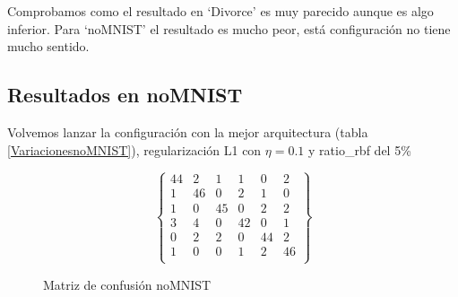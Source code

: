 Comprobamos como el resultado en `Divorce' es muy parecido aunque es algo inferior. Para `noMNIST' el resultado es mucho peor, está configuración no tiene mucho sentido.

\subsection{Resultados en noMNIST}

Volvemos lanzar la configuración con la mejor arquitectura (tabla \ref{VariacionesnoMNIST}), regularización L1 con $\eta=0.1$ y ratio\_rbf del 5\%

\begin{figure}[H]
\begin{equation*}
\begin{Bmatrix}
44 & 2 & 1 & 1 & 0 & 2 \\
 1 & 46 & 0 & 2 & 1 & 0 \\
 1 & 0 & 45 & 0 & 2 & 2 \\
 3 & 4 & 0 & 42 & 0 & 1 \\
 0 & 2 & 2 & 0 & 44 & 2 \\
 1 & 0 & 0 & 1 & 2 & 46 \\
\end{Bmatrix}
\end{equation*}
\caption{Matriz de confusión noMNIST}
\end{figure}

